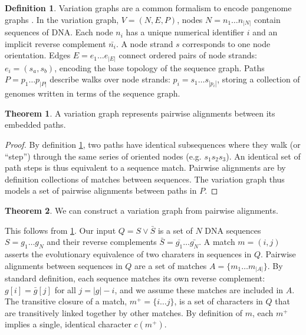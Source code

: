 \documentclass{bioinfo}
\theoremstyle{definition}
\newtheorem{definition}{Definition}[section]
\newtheorem{theorem}{Theorem}[section]
\begin{document}
\begin{definition}
\label{def:vg}
Variation graphs are a common formalism to encode pangenome graphs \citep{Garrison_2019_thesis}.
In the variation graph, $V = (N, E, P)$, nodes $N = n_1\ldots n_{|N|}$ contain sequences of DNA.
Each node $n_i$ has a unique numerical identifier $i$ and an implicit reverse complement $\bar{n_i}$.
A node strand $s$ corresponds to one node orientation.
Edges $E = e_1\ldots e_{|E|}$ connect ordered pairs of node strands: $e_i = ( s_a, s_b )$, encoding the base topology of the sequence graph.
Paths $P = p_1\ldots p_{|P|}$ describe walks over node strands: $p_i = s_1 \ldots s_{|p_i|}$, storing a collection of genomes written in terms of the sequence graph.
\end{definition}

\begin{theorem}
A variation graph represents pairwise alignments between its embedded paths.
\end{theorem}

\begin{proof}
By definition \ref{def:vg}, two paths have identical subsequences where they walk (or ``step'') through the same series of oriented nodes (e.g. $s_1 s_2 s_3$).
An identical set of path steps is thus equivalent to a sequence match.
Pairwise alignments are by definition collections of matches between sequences.
The variation graph thus models a set of pairwise alignments between paths in $P$.
\end{proof}

\begin{theorem}
We can construct a variation graph from pairwise alignments.
\end{theorem}

This follows from \ref{def:vg}.
Our input $Q = S \vee \bar{S}$ is a set of $N$ DNA sequences $S = g_1 \ldots g_N$ and their reverse complements $\bar{S} = \bar{g_1} \ldots \bar{g_N}$.
A match $m = (i, j)$ asserts the evolutionary equivalence of two charaters in sequences in $Q$.
Pairwise alignments between sequences in $Q$ are a set of matches $A = \{ m_1 \ldots m_{|A|} \}$.
By standard definition, each sequence matches its own reverse complement: $g[i] = \bar{g}[j]$ for all $j = |g| - i$, and we assume these matches are included in $A$.
The transitive closure of a match, $m^+ = \{ i \ldots j \}$, is a set of characters in $Q$ that are transitively linked together by other matches.
By definition of $m$, each $m^+$ implies a single, identical character $c(m^+)$.
\end{document}

